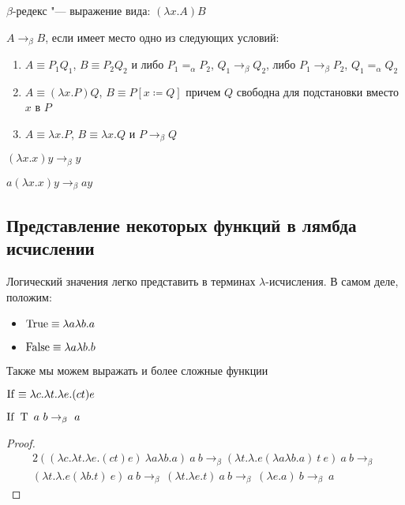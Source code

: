 \begin{definition}
	$\beta$-редекс "--- выражение вида: $\left(\lambda{}x.A\right)B$
\end{definition}

\begin{definition}
	$A\to_{\beta}B$, если имеет место одно из следующих условий:
	\begin{enumerate}
		\item $A\equiv{}P_{1}Q_{1}$, $B\equiv{}P_{2}Q_{2}$ и либо $P_{1}=_{\alpha}P_{2}$, $Q_{1}\to_{\beta}Q_{2}$, либо
		$P_{1}\to_{\beta}P_{2}$, $Q_{1}=_{\alpha}Q_{2}$
		\item $A\equiv\left(\lambda{}x.P\right) Q$, $B\equiv P[x\coloneqq{}Q]$ причем $Q$ свободна для подстановки вместо $x$ в $P$ 
		\item $A\equiv\lambda{}x.P$, $B\equiv\lambda{}x.Q$ и $P\to_{\beta}Q$
	\end{enumerate}
	\begin{example} 
		$\left(\lambda{}x.x\right) y\to_{\beta} y$
	\end{example}
	\begin{example}
		 $a \left(\lambda{}x.x\right) y\to_{\beta} a y$
	\end{example}
\end{definition}

\subsection{Представление некоторых функций в лямбда исчислении}
Логический значения легко представить в терминах $\lambda$-исчисления. В самом деле, положим:
\begin{itemize}
	\item $\operatorname{True}  \equiv \lambda{}a\lambda{}b.a$ 
	\item $\operatorname{False} \equiv \lambda{}a\lambda{}b.b$
\end{itemize}

\newcommand{\If}{\lambda{}c.\lambda{}t.\lambda{}e.(c t) e}
\newcommand{\T}{\lambda{}a\lambda{}b.a}
\newcommand{\F}{\lambda{}a\lambda{}b.b}
\newcommand{\Fl}{\func{F}}
\newcommand{\Tl}{\func{T}}


Также мы можем выражать и более сложные функции \\


\begin{definition}
	$\func{If} \equiv \If$
\end{definition}

\begin{example}
	$\func{If} \ \Tl \ a \ b \to_{\beta} \ a$
	\begin{proof}
		\begin{alignat*}{2}
		 ((\If) \ \T)\ a \ b \to_{\beta} (\lambda{}t.\lambda{}.e(\T) \ t \ e) \ a \ b \to_{\beta} \ \\ (\lambda{}t.\lambda{}.e(\lambda{}b.t) \ e) \ a \ b \to_{\beta} \ (\lambda{}t.\lambda{}e.t) \ a \ b \to_{\beta} \ (\lambda{}e.a) \ b \to_{\beta} \ a
		\end{alignat*}
	\end{proof}
\end{example}

